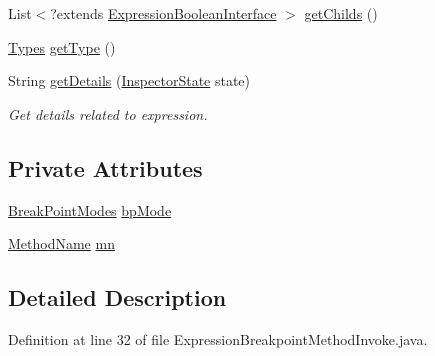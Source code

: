 \begin{DoxyCompactItemize}
List$<$?extends \hyperlink{interfacegov_1_1nasa_1_1jpf_1_1inspector_1_1server_1_1expression_1_1_expression_boolean_interface}{Expression\+Boolean\+Interface} $>$ \hyperlink{classgov_1_1nasa_1_1jpf_1_1inspector_1_1server_1_1expression_1_1_expression_boolean_leaf_aa99bf3cf13bd8cc1d6c33208bc83b185}{get\+Childs} ()
\item 
\hyperlink{enumgov_1_1nasa_1_1jpf_1_1inspector_1_1server_1_1expression_1_1_types}{Types} \hyperlink{classgov_1_1nasa_1_1jpf_1_1inspector_1_1server_1_1expression_1_1_expression_boolean_aed010ff8683eb1e8621e226703133457}{get\+Type} ()
\item 
String \hyperlink{classgov_1_1nasa_1_1jpf_1_1inspector_1_1server_1_1expression_1_1_expression_boolean_a43423e204404f24bf7862de938598eb7}{get\+Details} (\hyperlink{interfacegov_1_1nasa_1_1jpf_1_1inspector_1_1server_1_1expression_1_1_inspector_state}{Inspector\+State} state)
\begin{DoxyCompactList}\small\item\em Get details related to expression. \end{DoxyCompactList}\end{DoxyCompactItemize}
\subsection*{Private Attributes}
\begin{DoxyCompactItemize}
\item 
\hyperlink{enumgov_1_1nasa_1_1jpf_1_1inspector_1_1server_1_1breakpoints_1_1_break_point_modes}{Break\+Point\+Modes} \hyperlink{classgov_1_1nasa_1_1jpf_1_1inspector_1_1server_1_1expression_1_1expressions_1_1_expression_breakpoint_method_invoke_a15cf301f710ffb44deab92eaaeda05fc}{bp\+Mode}
\item 
\hyperlink{classgov_1_1nasa_1_1jpf_1_1inspector_1_1utils_1_1expressions_1_1_method_name}{Method\+Name} \hyperlink{classgov_1_1nasa_1_1jpf_1_1inspector_1_1server_1_1expression_1_1expressions_1_1_expression_breakpoint_method_invoke_a8a2dddc05a758fabc56ed95897ee1bc3}{mn}
\end{DoxyCompactItemize}


\subsection{Detailed Description}


Definition at line 32 of file Expression\+Breakpoint\+Method\+Invoke.\+java.



